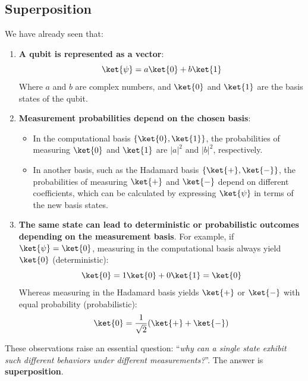 \subsection{Superposition}

We have already seen that:
\begin{enumerate}
    \item \textbf{A qubit is represented as a vector}:
    \begin{equation*}
        \ket{\psi} = a\ket{0} + b\ket{1}
    \end{equation*}
    Where $a$ and $b$ are complex numbers, and $\ket{0}$ and $\ket{1}$ are the basis states of the qubit.


    \item \textbf{Measurement probabilities depend on the chosen basis}:
    \begin{itemize}
        \item In the computational basis $\{\ket{0}, \ket{1}\}$, the probabilities of measuring $\ket{0}$ and $\ket{1}$ are $|a|^2$ and $|b|^2$, respectively.
        \item In another basis, such as the Hadamard basis $\{\ket{+}, \ket{-}\}$, the probabilities of measuring $\ket{+}$ and $\ket{-}$ depend on different coefficients, which can be calculated by expressing $\ket{\psi}$ in terms of the new basis states.
    \end{itemize}

    
    \item \textbf{The same state can lead to deterministic or probabilistic outcomes depending on the measurement basis}. For example, if $\ket{\psi} = \ket{0}$, measuring in the computational basis always yield $\ket{0}$ (deterministic):
    \begin{equation*}
        \ket{0} = 1\ket{0} + 0\ket{1} = \ket{0}
    \end{equation*}
    Whereas measuring in the Hadamard basis yields $\ket{+}$ or $\ket{-}$ with equal probability (probabilistic):
    \begin{equation*}
        \ket{0} = \frac{1}{\sqrt{2}}(\ket{+} + \ket{-})
    \end{equation*}
\end{enumerate}
These observations raise an essential question: ``\emph{why can a single state exhibit such different behaviors under different measurements?}''. The answer is \textbf{superposition}.

